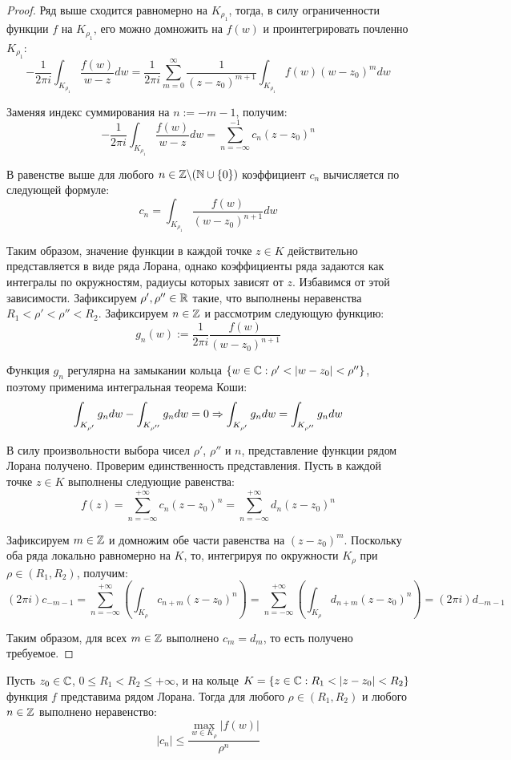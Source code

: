 \begin{proof}
	Ряд выше сходится равномерно на $K_{\rho_1}$, тогда, в силу ограниченности функции $f$ на $K_{\rho_1}$, его можно домножить на $f(w)$ и проинтегрировать почленно $K_{\rho_1}$:
	\[- \frac1{2\pi i} \int_{K_{\rho_1}}\frac{f(w)}{w - z}dw = \frac1{2\pi i}\sum_{m=0}^\infty\frac1{(z-z_0)^{m + 1}}\int_{K_{\rho_1}}f(w)(w-z_0)^mdw\]
	
	Заменяя индекс суммирования на $n := -m - 1$, получим:
	\[-\frac1{2\pi i} \int_{K_{\rho_1}}\frac{f(w)}{w - z}dw = \sum_{n = -\infty}^{-1}c_n(z - z_0)^n\]
	
	В равенстве выше для любого $n \in \mathbb{Z} \backslash (\mathbb{N} \cup \{0\})$ коэффициент $c_n$ вычисляется по следующей формуле:
	\[c_n = \int_{K_{\rho_1}}\frac{f(w)}{(w - z_0)^{n+1}}dw\]
	
	Таким образом, значение функции в каждой точке $z \in K$ действительно представляется в виде ряда Лорана, однако коэффициенты ряда задаются как интегралы по окружностям, радиусы которых зависят от $z$. Избавимся от этой зависимости. Зафиксируем $\rho', \rho'' \in \mathbb{R}$ такие, что выполнены неравенства $R_1 < \rho' < \rho'' < R_2$. Зафиксируем $n \in \mathbb{Z}$ и рассмотрим следующую функцию:
	\[g_n(w) := \frac1{2\pi i} \frac{f(w)}{(w - z_0)^{n+1}}\]
	
	Функция $g_n$ регулярна на замыкании кольца $\{w \in \mathbb{C}: \rho' < |w - z_0| < \rho''\}$, поэтому применима интегральная теорема Коши:
	\[\int_{K_{\rho'}}g_ndw - \int_{K_{\rho''}}g_ndw = 0 \Rightarrow \int_{K_{\rho'}}g_ndw = \int_{K_{\rho''}}g_ndw\]
	
	В силу произвольности выбора чисел $\rho'$, $\rho''$ и $n$, представление функции рядом Лорана получено. Проверим единственность представления. Пусть в каждой точке $z \in K$ выполнены следующие равенства:
	\[f(z) = \sum_{n = -\infty}^{+\infty}c_n(z - z_0)^n = \sum_{n = -\infty}^{+\infty}d_n(z - z_0)^n\]
	
	Зафиксируем $m \in \mathbb{Z}$ и домножим обе части равенства на $(z - z_0)^m$. Поскольку оба ряда локально равномерно на $K$, то, интегрируя по окружности $K_{\rho}$ при $\rho \in (R_1, R_2)$, получим:
	\[{(2\pi i)}{c_{-m - 1}} = \sum_{n = -\infty}^{+\infty}\left(\int_{K_{\rho}}c_{n + m}(z - z_0)^n\right) = \sum_{n = -\infty}^{+\infty}\left(\int_{K_{\rho}}d_{n + m}(z - z_0)^n\right) = {(2\pi i)}{d_{-m - 1}}\]
	
	Таким образом, для всех $m \in \mathbb{Z}$ выполнено $c_m = d_m$, то есть получено требуемое.
\end{proof}

\begin{proposition}
	Пусть $z_0 \in \mathbb{C}$, $0 \le R_1 < R_2 \le +\infty$, и на кольце $K = \{z \in \mathbb{C}: R_1 < |z - z_0| < R_2\}$ функция $f$ представима рядом Лорана. Тогда для любого $\rho \in (R_1, R_2)$ и любого $n \in \mathbb{Z}$ выполнено неравенство:
	\[|c_n| \le \frac{\max_{w \in K_{\rho}}\left|{f(w)}\right|}{\rho^n}\]
\end{proposition}

